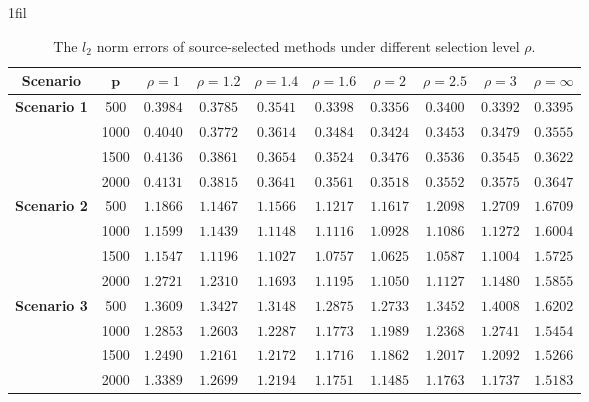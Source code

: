 \documentclass[12pt]{article}
\makeatletter
\newcommand*{\centerfloat}{%
  \parindent \z@
  \leftskip \z@ \@plus 1fil \@minus \marginparwidth
  \rightskip \leftskip
  \parfillskip \z@skip}
\makeatother
\begin{document}
\begin{table}[!ht]
\renewcommand{\arraystretch}{0.65}
\footnotesize
    \centerfloat
    \caption{The $l_2$ norm errors of source-selected methods under different selection level $\rho$.}
     \label{table: source_selection}
    \begin{tabular}{cccccccccc}
    \toprule
    \textbf{Scenario} & $\bm{p}$ & $\rho = 1$ & $\rho = 1.2$& $\rho = 1.4$ & $\rho = 1.6$ & $\rho = 2$ & $\rho = 2.5$ & $\rho = 3$ & $\rho=\infty$ \\
    \midrule
       \multirow{4}{*}{\textbf{Scenario 1}}  & 500 &  $0.3984$& $0.3785$ &$0.3541$&$0.3398$& $0.3356$ &$0.3400$ &$0.3392$& $0.3395$  \\
                                        & 1000 &  $0.4040$ &$0.3772$ &$0.3614$ &$0.3484$ &$0.3424$ &$0.3453$& $0.3479$& $0.3555$   \\ 
                                         & 1500 &  $0.4136$& $0.3861$ &$0.3654$ &$0.3524$ &$0.3476$ &$0.3536$ &$0.3545$& $0.3622$   \\ 
                                          & 2000 &  $0.4131$ &$0.3815$ &$0.3641$ &$0.3561$ &$0.3518$& $0.3552$& $0.3575$ &$0.3647$    \\ 
                                          \hline
       \multirow{4}{*}{\textbf{Scenario 2}}  & 500 &  $1.1866$ &$1.1467$& $1.1566$ &$1.1217$ &$1.1617$ &$1.2098$ &$1.2709$ & $1.6709$    \\
                                & 1000 &   $1.1599$ &$1.1439$ &$1.1148$ &$1.1116$ &$1.0928$& $1.1086$ &$1.1272$& $1.6004$   \\ 
                                 & 1500 &   $1.1547$& $1.1196$ &$1.1027$& $1.0757$ &$1.0625$ &$1.0587$& $1.1004$& $1.5725$  \\ 
                                  & 2000 &   $1.2721$ &$1.2310$& $1.1693$& $1.1195$& $1.1050$ &$1.1127$ &$1.1480$ &$1.5855$   \\                      \hline
       \multirow{4}{*}{\textbf{Scenario 3}}  & 500 &  $1.3609$ &$1.3427$& $1.3148$ &$1.2875$ &$1.2733$ &$1.3452$ &$1.4008$ & $1.6202$    \\
                                & 1000 &   $1.2853$ &$1.2603$ &$1.2287$ &$1.1773$ &$1.1989$& $1.2368$ &$1.2741$& $1.5454$   \\ 
                                 & 1500 &   $1.2490$& $1.2161$ &$1.2172$& $1.1716$ &$1.1862$ &$1.2017$& $1.2092$& $1.5266$  \\ 
                                  & 2000 &   $1.3389$ &$1.2699$& $1.2194$& $1.1751$& $1.1485$ &$1.1763$ &$1.1737$ &$1.5183$   \\           
    \bottomrule
    \end{tabular}
\end{table}
\end{document}
